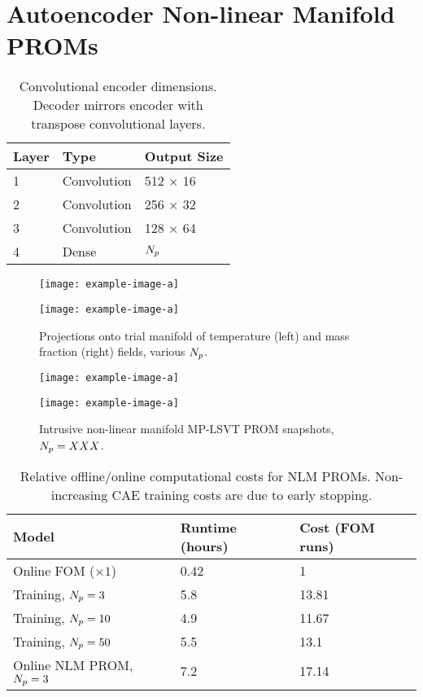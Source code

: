 \section{Autoencoder Non-linear Manifold PROMs}

\begin{table}
	\centering
	\begin{tabular}{ lll }
	\toprule
	Layer & Type & Output Size  \\
	\midrule
	1 & Convolution & 512 $\times$ 16 \\
    2 & Convolution & 256 $\times$ 32 \\
    3 & Convolution & 128 $\times$ 64 \\
    4 & Dense & $N_p$ \\
	\bottomrule
	\end{tabular}
	\caption{\label{tab:caeArch}Convolutional encoder dimensions. Decoder mirrors encoder with transpose convolutional layers.}
\end{table}

\begin{figure}
    \begin{minipage}{0.49\linewidth}
        \texttt{[image: example-image-a]}
    \end{minipage}
    \begin{minipage}{0.49\linewidth}
        \texttt{[image: example-image-a]}
    \end{minipage}
    \caption{Projections onto trial manifold of temperature (left) and mass fraction (right) fields, various $N_p$.}
\end{figure}

\begin{figure}
    \begin{minipage}{0.49\linewidth}
        \texttt{[image: example-image-a]}
    \end{minipage}
    \begin{minipage}{0.49\linewidth}
        \texttt{[image: example-image-a]}
    \end{minipage}
    \caption{Intrusive non-linear manifold MP-LSVT PROM snapshots, $N_p = XXX$.}
\end{figure}

\begin{table}
	\centering
	\begin{tabular}{ lll }
	\toprule
	Model & Runtime (hours) & Cost (FOM runs)  \\
	\midrule
    Online FOM ($\times 1$) & 0.42 & 1 \\
    Training, $N_p = 3$ & 5.8 & 13.81 \\
    Training, $N_p = 10$ & 4.9 & 11.67 \\
    Training, $N_p = 50$ & 5.5 & 13.1 \\
    Online NLM PROM, $N_p = 3$ & 7.2 & 17.14 \\
	\bottomrule
	\end{tabular}
	\caption{\label{tab:caeCost}Relative offline/online computational costs for NLM PROMs. Non-increasing CAE training costs are due to early stopping.}
\end{table}

